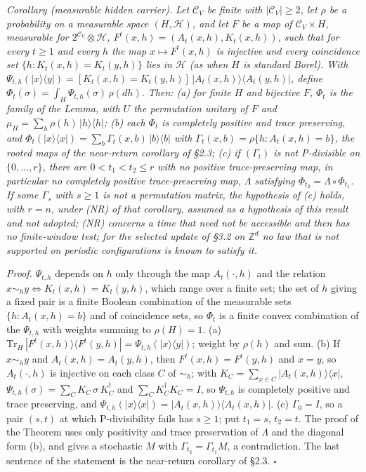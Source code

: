 \documentclass[
]{article}
\begin{document}
\emph{Corollary (measurable hidden carrier).} \emph{Let
\(\mathcal{C}_V\) be finite with \(|\mathcal{C}_V| \geq 2\), let
\(\rho\) be a probability on a measurable space \((H, \mathcal{H})\),
and let \(F\) be a map of \(\mathcal{C}_V \times H\), measurable for
\(2^{\mathcal{C}_V} \otimes \mathcal{H}\),
\(F^t(x, h) = (A_t(x, h), K_t(x, h))\), such that for every \(t \geq 1\)
and every \(h\) the map \(x \mapsto F^t(x, h)\) is injective and every
coincidence set \(\{h : K_t(x, h) = K_t(y, h)\}\) lies in
\(\mathcal{H}\) (as when \(H\) is standard Borel). With
\(\Psi_{t,h}(|x\rangle\langle y|) = [K_t(x, h) = K_t(y, h)]\,|A_t(x, h)\rangle\langle A_t(y, h)|\),
define \(\Phi_t(\sigma) = \int_H \Psi_{t,h}(\sigma)\,\rho(dh)\). Then:
(a) for finite \(H\) and bijective \(F\), \(\Phi_t\) is the family of
the Lemma, with \(U\) the permutation unitary of \(F\) and
\(\mu_H = \sum_h \rho(h)\,|h\rangle\langle h|\); (b) each \(\Phi_t\) is
completely positive and trace preserving, and
\(\Phi_t(|x\rangle\langle x|) = \sum_b \Gamma_t(x, b)\,|b\rangle\langle b|\)
with \(\Gamma_t(x, b) = \rho\{h : A_t(x, h) = b\}\), the rooted maps of
the near-return corollary of §2.3; (c) if \((\Gamma_t)\) is not
P-divisible on \(\{0, \ldots, r\}\), there are \(0 < t_1 < t_2 \leq r\)
with no positive trace-preserving map, in particular no completely
positive trace-preserving map, \(\Lambda\) satisfying
\(\Phi_{t_2} = \Lambda \circ \Phi_{t_1}\). If some \(\Gamma_s\) with
\(s \geq 1\) is not a permutation matrix, the hypothesis of (c) holds,
with \(r = n\), under (NR) of that corollary, assumed as a hypothesis of
this result and not adopted; (NR) concerns a time that need not be
accessible and then has no finite-window test; for the selected update
of §3.2 on \(\mathbb{Z}^d\) no law that is not supported on periodic
configurations is known to satisfy it.}

\emph{Proof.} \(\Psi_{t,h}\) depends on \(h\) only through the map
\(A_t(\cdot, h)\) and the relation
\(x \sim_h y \iff K_t(x, h) = K_t(y, h)\), which range over a finite
set; the set of \(h\) giving a fixed pair is a finite Boolean
combination of the measurable sets \(\{h : A_t(x, h) = b\}\) and of
coincidence sets, so \(\Phi_t\) is a finite convex combination of the
\(\Psi_{t,h}\) with weights summing to \(\rho(H) = 1\). (a)
\(\mathrm{Tr}_H\,|F^t(x, h)\rangle\langle F^t(y, h)| = \Psi_{t,h}(|x\rangle\langle y|)\);
weight by \(\rho(h)\) and sum. (b) If \(x \sim_h y\) and
\(A_t(x, h) = A_t(y, h)\), then \(F^t(x, h) = F^t(y, h)\) and \(x = y\),
so \(A_t(\cdot, h)\) is injective on each class \(C\) of \(\sim_h\);
with \(K_C = \sum_{x \in C} |A_t(x, h)\rangle\langle x|\),
\(\Psi_{t,h}(\sigma) = \sum_C K_C\,\sigma\,K_C^\dagger\) and
\(\sum_C K_C^\dagger K_C = I\), so \(\Psi_{t,h}\) is completely positive
and trace preserving, and
\(\Psi_{t,h}(|x\rangle\langle x|) = |A_t(x, h)\rangle\langle A_t(x, h)|\).
(c) \(\Gamma_0 = I\), so a pair \((s, t)\) at which P-divisibility fails
has \(s \geq 1\); put \(t_1 = s\), \(t_2 = t\). The proof of the Theorem
uses only positivity and trace preservation of \(\Lambda\) and the
diagonal form (b), and gives a stochastic \(M\) with
\(\Gamma_{t_2} = \Gamma_{t_1} M\), a contradiction. The last sentence of
the statement is the near-return corollary of §2.3. \(\square\)
\end{document}
